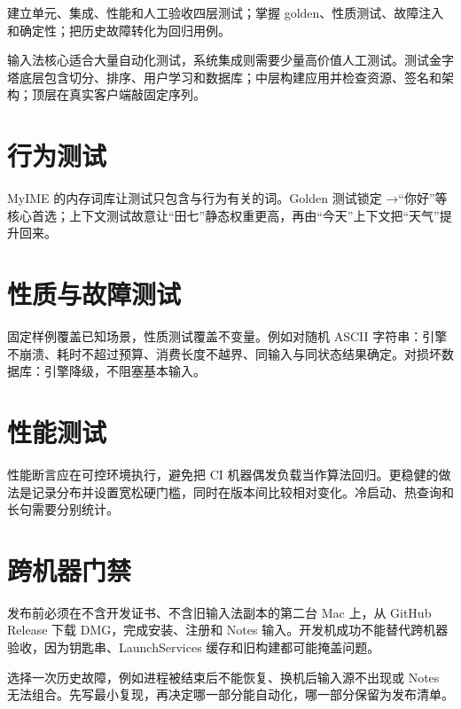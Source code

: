 \begin{goals}
建立单元、集成、性能和人工验收四层测试；掌握 golden、性质测试、故障注入和确定性；把历史故障转化为回归用例。
\end{goals}

输入法核心适合大量自动化测试，系统集成则需要少量高价值人工测试。测试金字塔底层包含切分、排序、用户学习和数据库；中层构建应用并检查资源、签名和架构；顶层在真实客户端敲固定序列。


\section{行为测试}

MyIME 的内存词库让测试只包含与行为有关的词。Golden 测试锁定 →“你好”等核心首选；上下文测试故意让“田七”静态权重更高，再由“今天”上下文把“天气”提升回来。



\section{性质与故障测试}

固定样例覆盖已知场景，性质测试覆盖不变量。例如对随机 ASCII 字符串：引擎不崩溃、耗时不超过预算、消费长度不越界、同输入与同状态结果确定。对损坏数据库：引擎降级，不阻塞基本输入。

\section{性能测试}

性能断言应在可控环境执行，避免把 CI 机器偶发负载当作算法回归。更稳健的做法是记录分布并设置宽松硬门槛，同时在版本间比较相对变化。冷启动、热查询和长句需要分别统计。

\section{跨机器门禁}

发布前必须在不含开发证书、不含旧输入法副本的第二台 Mac 上，从 GitHub Release 下载 DMG，完成安装、注册和 Notes 输入。开发机成功不能替代跨机器验收，因为钥匙串、LaunchServices 缓存和旧构建都可能掩盖问题。

\begin{lab}
选择一次历史故障，例如进程被结束后不能恢复、换机后输入源不出现或 Notes 无法组合。先写最小复现，再决定哪一部分能自动化，哪一部分保留为发布清单。
\end{lab}

